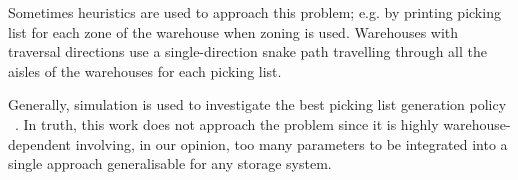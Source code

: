 Sometimes heuristics are used to approach this problem; e.g. by printing picking list for each zone of the warehouse when zoning is used. Warehouses with traversal directions use a single-direction snake path travelling through all the aisles of the warehouses for each picking list.\par

Generally, simulation is used to investigate the best picking list generation policy ~\cite{Chew1999, Hall1993, Kim2002, Petersen1999}. In truth, this work does not approach the problem since it is highly warehouse-dependent involving, in our opinion, too many parameters to be integrated into a single approach generalisable for any storage system.






